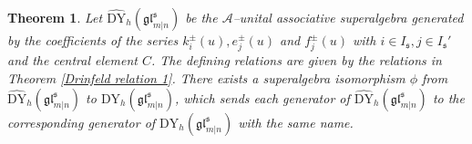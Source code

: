 \documentclass[a4paper,12pt]{article}
\newtheorem{theo}{{Theorem}}[section]
\numberwithin{equation}{section}
\begin{document}
\begin{theo}\label{iso gl}
Let $\widehat{\mathrm{DY}}_{h}(\mathfrak{gl}_{m|n}^{\mathfrak{s}})$ be the $\mathcal{A}$--unital associative superalgebra  generated by the coefficients of the series $k_{i}^{\pm}(u), e_{j}^{\pm}(u)$ and $f_{j}^{\pm}(u)$ with $i\in I_{\mathfrak{s}}, j\in I_{\mathfrak{s}}'$ and the central element $C$. The defining relations are given by the relations in Theorem \ref{Drinfeld relation 1}. There exists a superalgebra isomorphism $\phi$ from $\widehat{\mathrm{DY}}_{h}(\mathfrak{gl}_{m|n}^{\mathfrak{s}})$ to  $\mathrm{DY}_{h}(\mathfrak{gl}_{m|n}^{\mathfrak{s}})$, which sends each generator of $\widehat{\mathrm{DY}}_{h}(\mathfrak{gl}_{m|n}^{\mathfrak{s}})$ to the corresponding generator of $\mathrm{DY}_{h}(\mathfrak{gl}_{m|n}^{\mathfrak{s}})$ with the same name.
\end{theo}
\end{document}
